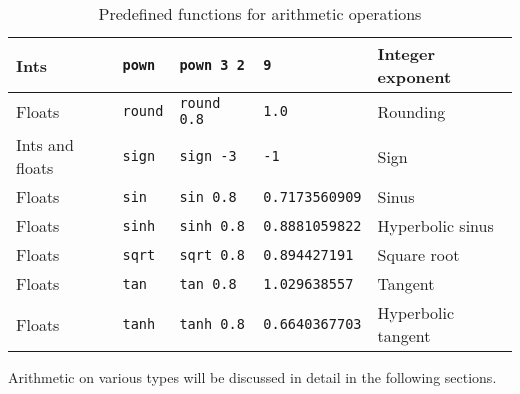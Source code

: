 \begin{table}
\begin{tabular}{|l|l|l|l|l|}
    \hline 
    Ints & \lstinline!pown! & \lstinline!pown 3 2! & \lstinline!9! & Integer exponent\\
    \hline 
    Floats & \lstinline!round! & \lstinline!round 0.8! & \lstinline!1.0! & Rounding\\
    \hline 
    Ints and floats & \lstinline!sign! & \lstinline!sign -3! & \lstinline!-1! & Sign\\
    \hline 
    Floats & \lstinline!sin! & \lstinline!sin 0.8! & \lstinline!0.7173560909! & Sinus\\
    \hline 
    Floats & \lstinline!sinh! & \lstinline!sinh 0.8! & \lstinline!0.8881059822! & Hyperbolic sinus\\
    \hline 
    Floats & \lstinline!sqrt! & \lstinline!sqrt 0.8! & \lstinline!0.894427191! & Square root\\
    \hline 
    Floats & \lstinline!tan! & \lstinline!tan 0.8! & \lstinline!1.029638557! & Tangent\\
    \hline 
    Floats & \lstinline!tanh! & \lstinline!tanh 0.8! & \lstinline!0.6640367703! & Hyperbolic tangent\\
    \hline 
  \end{tabular}
  \caption{Predefined functions for arithmetic operations}
  \label{tab:arithmeticFunctions}
\end{table}
Arithmetic on various types will be discussed in detail in the following sections. 


